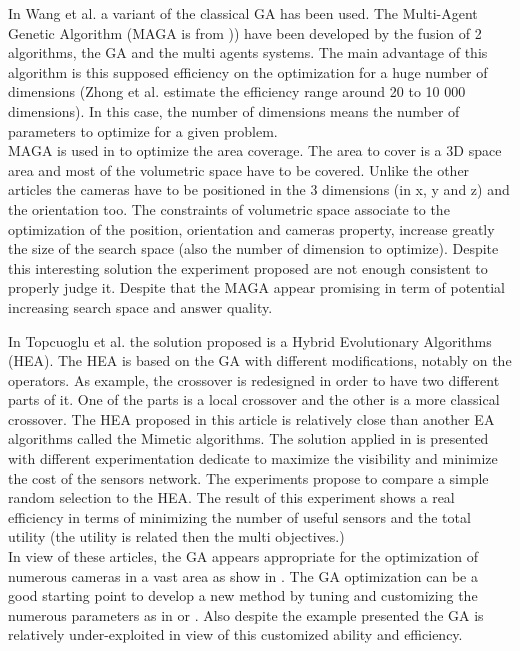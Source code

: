 In Wang et al. \cite{152*wang2009} a variant of the classical GA has been used. The Multi-Agent Genetic Algorithm (MAGA is from \cite{223*zhong2004})) have been developed by the fusion of 2 algorithms, the GA and the multi agents systems. The main advantage of this algorithm is this supposed efficiency on the optimization for a huge number of dimensions (Zhong et al. estimate the efficiency range around 20 to 10 000 dimensions). In this case, the number of dimensions means the number of parameters to optimize for a given problem.\\
MAGA is used in \cite{152*wang2009} to optimize the area coverage. The area to cover is a 3D space area and most of the volumetric space have to be covered.  Unlike the other articles the cameras have to be positioned in the 3 dimensions (in x, y and z) and the orientation too. The constraints of volumetric space associate to the optimization of the position, orientation and cameras property, increase greatly the size of the search space (also  the number of dimension to optimize).  
Despite this interesting solution the experiment proposed are not enough consistent to properly judge it. Despite that the MAGA appear promising in term of  potential increasing search space and answer quality. 

In Topcuoglu et al. \cite{101*topcuoglu2009} the solution proposed is a Hybrid Evolutionary Algorithms (HEA).  The HEA is based on the GA with different modifications, notably on the operators. As example, the crossover is redesigned in order to have two different parts of it. 
One of the parts is a local crossover and the other is a more classical crossover.  
The HEA proposed in this article is relatively close than another EA algorithms called the Mimetic algorithms. 
The solution applied in \cite{101*topcuoglu2009} is  presented with different experimentation dedicate  to maximize the visibility and minimize the cost of the sensors network. The experiments propose to compare a simple random selection to the HEA. The result of this experiment shows a real efficiency in terms of minimizing the number of useful sensors and the total utility (the utility is related then the multi objectives.) \\

In view of these articles, the GA appears appropriate for the optimization of numerous cameras in  a vast area as show in \cite{165*jiang2010}. The GA optimization can be a good starting point to develop a new method by tuning and customizing the numerous parameters as in \cite{101*topcuoglu2009,152*wang2009}  or \cite{83*van2009}. Also despite the example presented  the GA is relatively under-exploited in view of this customized ability and efficiency.


